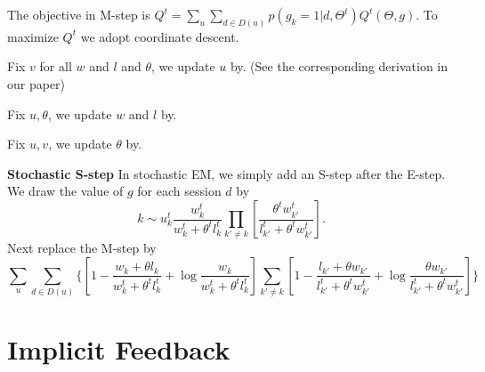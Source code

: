 \documentclass{article}
\begin{document}
The objective in M-step is $ Q^t= \sum_u \sum_{d\in D(u)} p(g_k=1|d,\Theta^{t})  Q^t(\Theta,g)$.   To maximize $Q^t$ we adopt coordinate descent.
  
 Fix $v$ for all $w$ and $l$ and $\theta$, we update $u$ by. (See the corresponding derivation in our paper)
 
 Fix $u,\theta$, we update $w$ and $l$ by.
 
 Fix $u,v$, we update $\theta$ by.
 
 \textbf{Stochastic S-step} 
 In stochastic EM, we simply add an S-step after the E-step. We draw the value of $g$ for each session $d$ by
 \begin{equation}
 k \sim u_k^{t} \frac{w_{k}^t} {w_{k}^t+\theta^t l_{k}^t} \prod_{k'\neq k}  [\frac{\theta^t w_{k'}^t} {l_{k'}^t + \theta^t w_{k'}^t}].
 \end{equation}
 Next replace the M-step by
 \begin{equation}
 \sum_u \sum_{d\in D(u)} \{[ 1- \frac{w_k+\theta l_k}{ w_k^t + \theta^t l_k^t}  + \log \frac{w_{k}} {w_{k}^t+\theta ^t l_{k}^t} ] \sum_{k'\neq k}  [ 1- \frac{ l_{k'}+\theta w_{k'}}{ l_{k'}^t+\theta^t w_{k'}^t}  + \log \frac{\theta w_{k'}} {l_{k'}^t+\theta ^t w_{k'}^t} ] \}
 \end{equation}
\section{Implicit Feedback}
\end{document}
